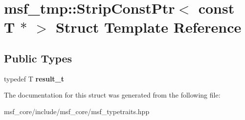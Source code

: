 \hypertarget{structmsf__tmp_1_1StripConstPtr_3_01const_01T_01_5_01_4}{\section{msf\-\_\-tmp\-:\-:Strip\-Const\-Ptr$<$ const T $\ast$ $>$ Struct Template Reference}
\label{structmsf__tmp_1_1StripConstPtr_3_01const_01T_01_5_01_4}
}
\subsection*{Public Types}
\begin{DoxyCompactItemize}
\item 
\hypertarget{structmsf__tmp_1_1StripConstPtr_3_01const_01T_01_5_01_4_abd775b4e0a2c4592dbbb4c7cc6910535}{typedef T {\bfseries result\-\_\-t}}\label{structmsf__tmp_1_1StripConstPtr_3_01const_01T_01_5_01_4_abd775b4e0a2c4592dbbb4c7cc6910535}

\end{DoxyCompactItemize}


The documentation for this struct was generated from the following file\-:\begin{DoxyCompactItemize}
\item 
msf\-\_\-core/include/msf\-\_\-core/msf\-\_\-typetraits.\-hpp\end{DoxyCompactItemize}
